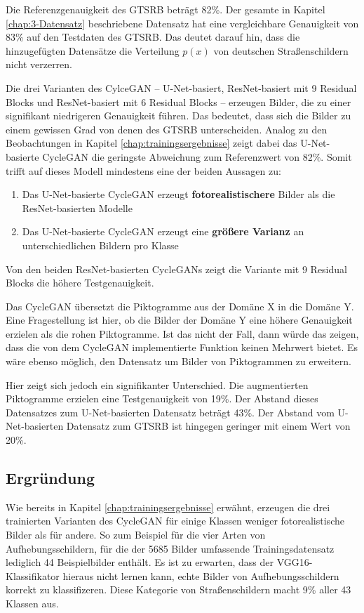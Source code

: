 Die Referenzgenauigkeit des \ac{GTSRB} beträgt 82\%. Der gesamte in Kapitel \ref{chap:3-Datensatz} beschriebene Datensatz hat eine vergleichbare Genauigkeit von 83\% auf den Testdaten des \ac{GTSRB}. Das deutet darauf hin, dass die hinzugefügten Datensätze die Verteilung $p(x)$ von deutschen Straßenschildern nicht verzerren.

Die drei Varianten des \ac{CylceGAN} -- U-Net-basiert, ResNet-basiert mit 9 Residual Blocks und ResNet-basiert mit 6 Residual Blocks -- erzeugen Bilder, die zu einer signifikant niedrigeren Genauigkeit führen. Das bedeutet, dass sich die Bilder zu einem gewissen Grad von denen des \ac{GTSRB} unterscheiden. Analog zu den Beobachtungen in Kapitel \ref{chap:trainingsergebnisse} zeigt dabei das U-Net-basierte \ac{CycleGAN} die geringste Abweichung zum Referenzwert von 82\%. Somit trifft auf dieses Modell mindestens eine der beiden Aussagen zu:
\begin{enumerate}
	\item Das U-Net-basierte \ac{CycleGAN} erzeugt \textbf{fotorealistischere} Bilder als die ResNet-basierten Modelle
	\item Das U-Net-basierte \ac{CycleGAN} erzeugt eine \textbf{größere Varianz} an unterschiedlichen Bildern pro Klasse
\end{enumerate}
Von den beiden ResNet-basierten \acp{CycleGAN} zeigt die Variante mit 9 Residual Blocks die höhere Testgenauigkeit.

Das \ac{CycleGAN} übersetzt die Piktogramme aus der Domäne X in die Domäne Y. Eine Fragestellung ist hier, ob die Bilder der Domäne Y eine höhere Genauigkeit erzielen als die rohen Piktogramme. Ist das nicht der Fall, dann würde das zeigen, dass die von dem \ac{CycleGAN} implementierte Funktion keinen Mehrwert bietet. Es wäre ebenso möglich, den Datensatz um Bilder von Piktogrammen zu erweitern.

Hier zeigt sich jedoch ein signifikanter Unterschied. Die augmentierten Piktogramme erzielen eine Testgenauigkeit von 19\%. Der Abstand dieses Datensatzes zum U-Net-basierten Datensatz beträgt 43\%. Der Abstand vom U-Net-basierten Datensatz zum \ac{GTSRB} ist hingegen geringer mit einem Wert von 20\%.

\subsection{Ergründung}
Wie bereits in Kapitel \ref{chap:trainingsergebnisse} erwähnt, erzeugen die drei trainierten Varianten des \ac{CycleGAN} für einige Klassen weniger fotorealistische Bilder als für andere. So zum Beispiel für die vier Arten von Aufhebungsschildern, für die der 5685 Bilder umfassende Trainingsdatensatz lediglich 44 Beispielbilder enthält. Es ist zu erwarten, dass der VGG16-Klassifikator hieraus nicht lernen kann, echte Bilder von Aufhebungsschildern korrekt zu klassifizeren. Diese Kategorie von Straßenschildern macht 9\% aller 43 Klassen aus.

